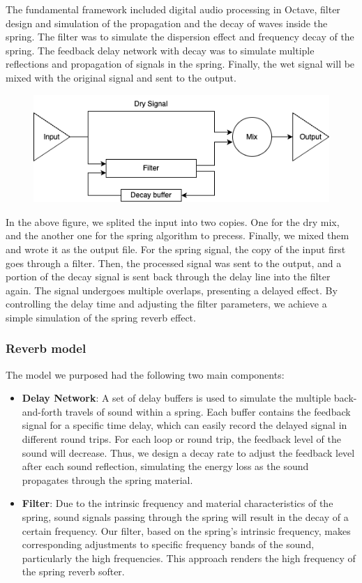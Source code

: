 \documentclass[12pt]{article}
\begin{document}
The fundamental framework included digital audio processing in Octave, filter design and simulation of the propagation and the decay of waves inside the spring. The filter was to simulate the dispersion effect and frequency decay of the spring. The feedback delay network with decay was to simulate multiple reflections and propagation of signals in the spring. Finally, the wet signal will be mixed with the original signal and sent to the output. 

\begin{figure}[h]
	\center
	\includegraphics[width=0.6\linewidth]{photos/reverb.drawio.png}
\end{figure}

In the above figure, we splited the input into two copies. One for the dry mix, and the another one for the spring algorithm to precess. Finally, we mixed them and wrote it as the output file. For the spring signal, the copy of the input first goes through a filter. Then, the processed signal was sent to the output, and a portion of the decay signal is sent back through the delay line into the filter again. The signal undergoes multiple overlaps, presenting a delayed effect. By controlling the delay time and adjusting the filter parameters, we achieve a simple simulation of the spring reverb effect.

\subsubsection{Reverb model}

The model we purposed had the following two main components:
\begin{itemize}
	\item \textbf{Delay Network}: A set of delay buffers is used to simulate the multiple back-and-forth travels of sound within a spring. Each buffer contains the feedback signal for a specific time delay, which can easily record the delayed signal in different round trips. For each loop or round trip, the feedback level of the sound will decrease. Thus, we design a decay rate to adjust the feedback level after each sound reflection, simulating the energy loss as the sound propagates through the spring material.
	
	\item \textbf{Filter}: Due to the intrinsic frequency and material characteristics of the spring, sound signals passing through the spring will result in the decay of a certain frequency. Our filter, based on the spring's intrinsic frequency, makes corresponding adjustments to specific frequency bands of the sound, particularly the high frequencies. This approach renders the high frequency of the spring reverb softer. 
	
\end{itemize}
\end{document}
